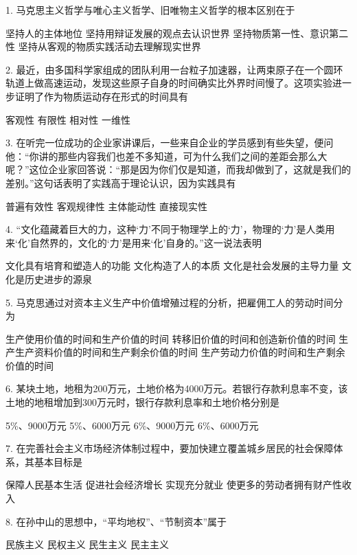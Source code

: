 1. 马克思主义哲学与唯心主义哲学、旧唯物主义哲学的根本区别在于
\begin{choices}
	 坚持人的主体地位
	 坚持用辩证发展的观点去认识世界
	 坚持物质第一性、意识第二性
	 坚持从客观的物质实践活动去理解现实世界
\end{choices}
2. 最近，由多国科学家组成的团队利用一台粒子加速器，让两束原子在一个圆环轨道上做高速运动，发现这些原子自身的时间确实比外界时间慢了。这项实验进一步证明了作为物质运动存在形式的时间具有
\begin{choices}
	 客观性
	 有限性
	 相对性
	 一维性
\end{choices}
3. 在听完一位成功的企业家讲课后，一些来自企业的学员感到有些失望，便问他：“你讲的那些内容我们也差不多知道，可为什么我们之间的差距会那么大呢？”这位企业家回答说：“那是因为你们仅是知道，而我却做到了，这就是我们的差别。”这句话表明了实践高于理论认识，因为实践具有
\begin{choices}
	 普遍有效性
	 客观规律性
	 主体能动性
	 直接现实性
\end{choices}
4. “文化蕴藏着巨大的力，这种‘力’不同于物理学上的‘力’，物理的‘力’是人类用来‘化’自然界的，文化的‘力’是用来‘化’自身的。”这一说法表明
\begin{choices}
	 文化具有培育和塑造人的功能
	 文化构造了人的本质
	 文化是社会发展的主导力量
	 文化是历史进步的源泉
\end{choices}
5. 马克思通过对资本主义生产中价值增殖过程的分析，把雇佣工人的劳动时间分为
\begin{choices}
	 生产使用价值的时间和生产价值的时间
	 转移旧价值的时间和创造新价值的时间
	 生产生产资料价值的时间和生产剩余价值的时间
	 生产劳动力价值的时间和生产剩余价值的时间
\end{choices}
6. 某块土地，地租为200万元，土地价格为4000万元。若银行存款利息率不变，该土地的地租增加到300万元时，银行存款利息率和土地价格分别是
\begin{choices}
	 5\%、9000万元
	 5\%、6000万元
	 6\%、9000万元
	 6\%、6000万元
\end{choices}
7. 在完善社会主义市场经济体制过程中，要加快建立覆盖城乡居民的社会保障体系，其基本目标是
\begin{choices}
	 保障人民基本生活
	 促进社会经济增长
	 实现充分就业
	 使更多的劳动者拥有财产性收入
\end{choices}
8. 在孙中山的思想中，“平均地权”、“节制资本”属于
\begin{choices}
	 民族主义
	 民权主义
	 民生主义
	 民主主义
\end{choices}
